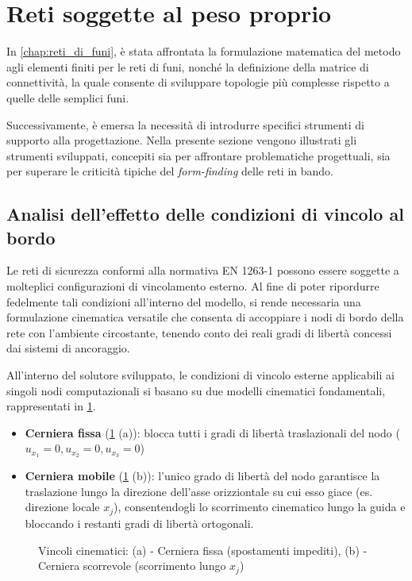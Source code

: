 \section{Reti soggette al peso proprio}
In \cref{chap:reti_di_funi}, è stata affrontata la formulazione matematica del metodo agli elementi finiti per le reti di funi, nonché la definizione della matrice di connettività, la quale consente di sviluppare topologie più complesse rispetto a quelle delle semplici funi. 

Successivamente, è emersa la necessità di introdurre specifici strumenti di supporto alla progettazione. Nella presente sezione vengono illustrati gli strumenti sviluppati, concepiti sia per affrontare problematiche progettuali, sia per superare le criticità tipiche del \textit{form-finding} delle reti in bando.

\subsection{Analisi dell'effetto delle condizioni di vincolo al bordo}
Le reti di sicurezza conformi alla normativa EN 1263-1 \cite{EN1263-1} possono essere soggette a molteplici configurazioni di vincolamento esterno. Al fine di poter ripordurre fedelmente tali condizioni all'interno del modello, si rende necessaria una formulazione cinematica versatile che consenta di accoppiare i nodi di bordo della rete con l'ambiente circostante, tenendo conto dei reali gradi di libertà concessi dai sistemi di ancoraggio.

All'interno del solutore sviluppato, le condizioni di vincolo esterne applicabili ai singoli nodi computazionali si basano su due modelli cinematici fondamentali, rappresentati in \cref{fig:confronto_vincoli}.
\begin{itemize}
   \item \textbf{Cerniera fissa} (\cref{fig:confronto_vincoli} (a)): blocca tutti i gradi di libertà traslazionali del nodo ($u_{x_1} = 0, u_{x_2} = 0, u_{x_3} = 0$)
   \item \textbf{Cerniera mobile} (\cref{fig:confronto_vincoli} (b)): l'unico grado di libertà del nodo garantisce la traslazione lungo la direzione dell'asse orizziontale su cui esso giace (es. direzione locale $x_j$), consentendogli lo scorrimento cinematico lungo la guida e bloccando i restanti gradi di libertà ortogonali.
\end{itemize}

\begin{figure}[htbp]
    \centering
    
    \caption{Vincoli cinematici: (a) -  Cerniera fissa (spostamenti impediti), (b) - Cerniera scorrevole (scorrimento lungo $x_j$)}
    \label{fig:confronto_vincoli}
\end{figure}


